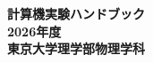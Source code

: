 \documentclass[uplatex,dvipdfmx]{jsbook}
\newcommand{\nendo}{2026}
\newcommand{\hann}{\nendo 年度}
\begin{document}
\thispagestyle{empty}
\pagestyle{empty}
\begin{titlepage}
    \vspace*{5cm}
    \begin{center}
        \textbf{\Huge 計算機実験ハンドブック}\\
        \vspace*{14cm}
        \textbf{\LARGE \hann}\\
        \vspace{1.0cm}
        \textbf{\LARGE 東京大学理学部物理学科}
    \end{center}
\end{titlepage}
\clearpage
\pagestyle{empty}
\cleardoublepage


\clearpage

\cleardoublepage

\setcounter{page}{1}
\setcounter{tocdepth}{3}
\tableofcontents

\clearpage
\pagestyle{plain}
\cleardoublepage






\end{document}
